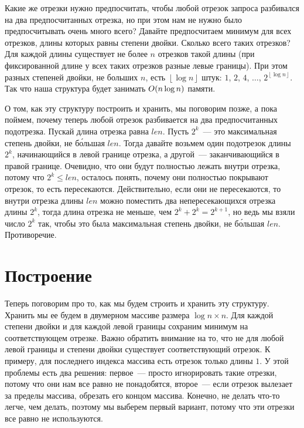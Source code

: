 Какие же отрезки нужно предпосчитать, чтобы любой отрезок запроса разбивался на два предпосчитанных отрезка, но при этом нам не нужно было предпосчитывать очень много всего? Давайте предпосчитаем минимум для всех отрезков, длины которых равны степени двойки. Сколько всего таких отрезков? Для каждой длины существует не более $n$ отрезков такой длины (при фиксированной длине у всех таких отрезков разные левые границы). При этом разных степеней двойки, не больших $n$, есть $\left\lfloor \log n \right\rfloor$ штук: $1$, $2$, $4$, $\ldots$, $2^{\left\lfloor \log n \right\rfloor}$. Так что наша структура будет занимать $O(n \log n)$ памяти.

О том, как эту структуру построить и хранить, мы поговорим позже, а пока поймем, почему теперь любой отрезок разбивается на два предпосчитанных подотрезка. Пускай длина отрезка равна $len$. Пусть $2^k$~--- это максимальная степень двойки, не б\'{о}льшая $len$. Тогда давайте возьмем один подотрезок длины $2^k$, начинающийся в левой границе отрезка, а другой~--- заканчивающийся в правой границе. Очевидно, что они будут полностью лежать внутри отрезка, потому что  $2^k \le len$, осталось понять, почему они полностью покрывают отрезок, то есть пересекаются. Действительно, если они не пересекаются, то внутри отрезка длины $len$ можно поместить два непересекающихся отрезка длины $2^k$, тогда длина отрезка не меньше, чем $2^k + 2^k = 2^{k + 1}$, но ведь мы взяли число $2^k$ так, чтобы это была максимальная степень двойки, не б\'{о}льшая $len$. Противоречие.

\section{Построение}

Теперь поговорим про то, как мы будем строить и хранить эту структуру. Хранить мы ее будем в двумерном массиве размера $\log n \times n$. Для каждой степени двойки и для каждой левой границы сохраним минимум на соответствующем отрезке. Важно обратить внимание на то, что не для любой левой границы и степени двойки существует соответствующий отрезок. К примеру, для последнего индекса массива есть отрезок только длины $1$. У этой проблемы есть два решения: первое~--- просто игнорировать такие отрезки, потому что они нам все равно не понадобятся, второе~--- если отрезок вылезает за пределы массива, обрезать его концом массива. Конечно, не делать что-то легче, чем делать, поэтому мы выберем первый вариант, потому что эти отрезки все равно не используются.

